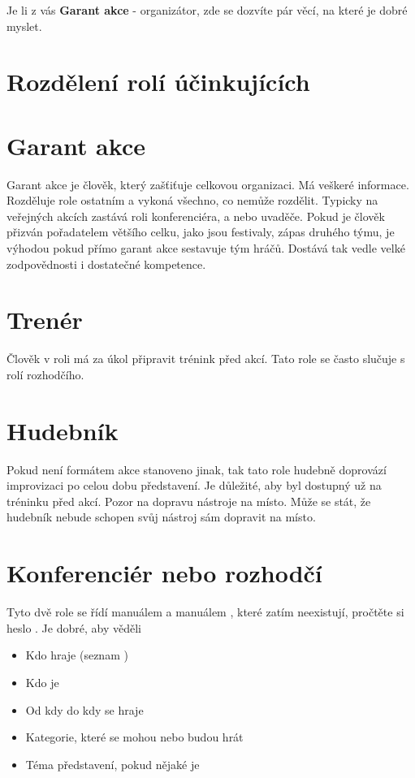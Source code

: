 \documentclass[main.tex]{subfiles}
\begin{document}
\needspace{5cm} \label{příprava zápasu} Je li z vás \textbf{Garant akce}{} - organizátor, zde se dozvíte pár věcí, na které je dobré myslet. 
\section{Rozdělení rolí účinkujících} \section{Garant akce} Garant akce je člověk, který zašťiťuje celkovou organizaci. Má veškeré informace. Rozděluje role ostatním a vykoná všechno, co nemůže rozdělit. Typicky na veřejných akcích zastává roli konferenciéra, a nebo uvaděče. Pokud je člověk přizván pořadatelem většího celku, jako jsou festivaly, zápas druhého týmu, je výhodou pokud přímo garant akce sestavuje tým hráčů. Dostává tak vedle velké zodpovědnosti i dostatečné kompetence. 
 
\section{Trenér} Člověk v roli  má za úkol připravit trénink před akcí. Tato role se často slučuje s rolí rozhodčího. 
\section{Hudebník} Pokud není formátem akce stanoveno jinak, tak tato role hudebně doprovází improvizaci po celou dobu představení. 
Je důležité, aby byl  dostupný už na tréninku před akcí. 
Pozor na dopravu nástroje na místo. Může se stát, že hudebník nebude schopen svůj nástroj sám dopravit na místo. 
 
\section{Konferenciér nebo rozhodčí} Tyto dvě role se řídí manuálem  a manuálem , které zatím neexistují, pročtěte si heslo . 
Je dobré, aby věděli 
\begin{itemize}
\item Kdo hraje (seznam )
\item Kdo je 
\item Od kdy do kdy se hraje
\item Kategorie, které se mohou nebo budou hrát
\item Téma představení, pokud nějaké je
\end{itemize}
\end{document}
